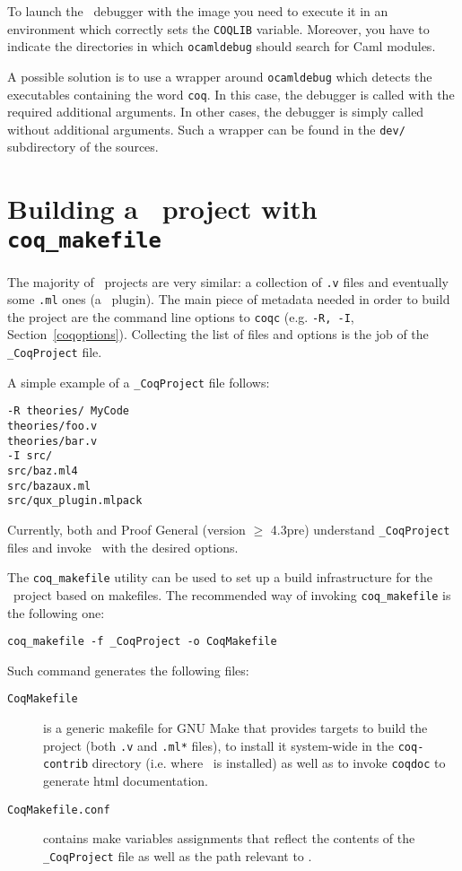 To launch the \ocaml\ debugger with the image you need to execute it in
an environment which correctly sets the \texttt{COQLIB} variable.
Moreover, you have to indicate the directories in which
\texttt{ocamldebug} should search for Caml modules.

A possible solution is to use a wrapper around \texttt{ocamldebug}
which detects the executables containing the word \texttt{coq}. In
this case, the debugger is called with the required additional
arguments. In other cases, the debugger is simply called without additional
arguments. Such a wrapper can be found in the \texttt{dev/}
subdirectory of the sources.


\section[Building a \Coq\ project with {\tt coq\_makefile}]
{Building a \Coq\ project with {\tt coq\_makefile}
\label{Makefile}
}

The majority of \Coq\ projects are very similar: a collection of {\tt .v}
files and eventually some {\tt .ml} ones (a \Coq\ plugin).  The main piece
of metadata needed in order to build the project are the command
line options to {\tt coqc} (e.g. {\tt -R, -I},
\SeeAlso Section~\ref{coqoptions}). Collecting the list of files and
options is the job of the {\tt \_CoqProject} file.

A simple example of a {\tt \_CoqProject} file follows:

\begin{verbatim}
-R theories/ MyCode
theories/foo.v
theories/bar.v
-I src/
src/baz.ml4
src/bazaux.ml
src/qux_plugin.mlpack
\end{verbatim}

Currently, both \CoqIDE{} and Proof General (version $\geq$ 4.3pre) understand
{\tt \_CoqProject} files and invoke \Coq\ with the desired options.

The {\tt coq\_makefile} utility can be used to set up a build infrastructure
for the \Coq\ project based on makefiles.  The recommended way of
invoking {\tt coq\_makefile} is the following one:

\begin{verbatim}
coq_makefile -f _CoqProject -o CoqMakefile
\end{verbatim}

Such command generates the following files:
\begin{description}
	\item[{\tt CoqMakefile}] is a generic makefile for GNU Make that provides targets to build the project (both {\tt .v} and {\tt .ml*} files), to install it system-wide in the {\tt coq-contrib} directory (i.e. where \Coq\ is installed) as well as to invoke {\tt coqdoc} to generate html documentation.

	\item[{\tt CoqMakefile.conf}] contains make variables assignments that reflect the contents of the {\tt \_CoqProject} file as well as the path relevant to \Coq{}.
\end{description}

